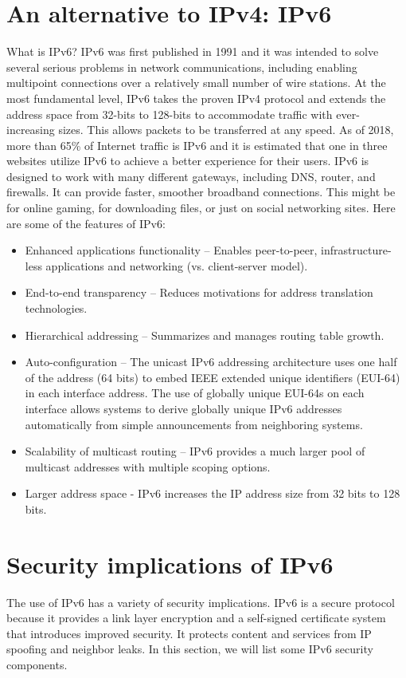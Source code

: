 \documentclass[conference,12pt]{IEEEtran}
\begin{document}
\section{An alternative to IPv4: IPv6}
What is IPv6? IPv6 was first published in 1991 and it was intended to solve several serious problems in network communications, including enabling multipoint connections over a relatively small number of wire stations. At the most fundamental level, IPv6 takes the proven IPv4 protocol and extends the address space from 32-bits to 128-bits to accommodate traffic with ever-increasing sizes. This allows packets to be transferred at any speed. As of 2018, more than 65\% of Internet traffic is IPv6 and it is estimated that one in three websites utilize IPv6 to achieve a better experience for their users. IPv6 is designed to work with many different gateways, including DNS, router, and firewalls. It can provide faster, smoother broadband connections. This might be for online gaming, for downloading files, or just on social networking sites. Here are some of the features of IPv6:
\begin{itemize}
\item Enhanced applications functionality – Enables peer-to-peer, infrastructure-less applications and networking (vs. client-server model).
\item End-to-end transparency – Reduces motivations for address translation technologies.
\item Hierarchical addressing – Summarizes and manages routing table growth.
\item Auto-configuration – The unicast IPv6 addressing architecture uses one half of the address (64 bits) to embed IEEE extended unique identifiers (EUI-64) in each interface address. The use of globally unique EUI-64s on each interface allows systems to derive globally unique IPv6 addresses automatically from simple announcements from neighboring systems.
\item Scalability of multicast routing – IPv6 provides a much larger pool of multicast addresses with multiple scoping options.
\item Larger address space - IPv6 increases the IP address size from 32 bits to 128 bits.
\end{itemize}

\section{Security implications of IPv6}
The use of IPv6 has a variety of security implications. IPv6 is a secure protocol because it provides a link layer encryption and a self-signed certificate system that introduces improved security. It protects content and services from IP spoofing and neighbor leaks. In this section, we will list some IPv6 security components.
\end{document}
